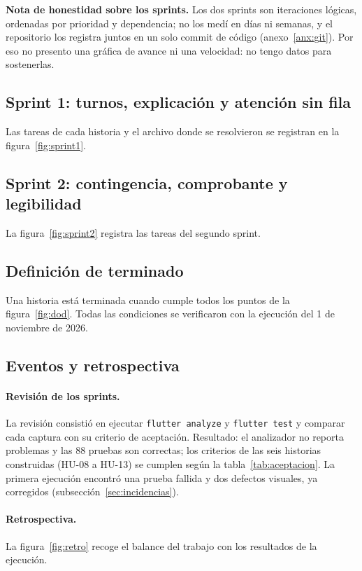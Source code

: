 \textbf{Nota de honestidad sobre los sprints.} Los dos sprints son iteraciones lógicas, ordenadas por prioridad y dependencia; no los medí en días ni semanas, y el repositorio los registra juntos en un solo commit de código (anexo~\ref{anx:git}). Por eso no presento una gráfica de avance ni una velocidad: no tengo datos para sostenerlas.

\subsection{Sprint 1: turnos, explicación y atención sin fila}
Las tareas de cada historia y el archivo donde se resolvieron se registran en la figura~\ref{fig:sprint1}.


\subsection{Sprint 2: contingencia, comprobante y legibilidad}
La figura~\ref{fig:sprint2} registra las tareas del segundo sprint.


\subsection{Definición de terminado}
Una historia está terminada cuando cumple todos los puntos de la figura~\ref{fig:dod}. Todas las condiciones se verificaron con la ejecución del 1 de noviembre de 2026.


\subsection{Eventos y retrospectiva}
\label{sec:retro}
\paragraph{Revisión de los sprints.} La revisión consistió en ejecutar \texttt{flutter analyze} y \texttt{flutter test} y comparar cada captura con su criterio de aceptación. Resultado: el analizador no reporta problemas y las 88 pruebas son correctas; los criterios de las seis historias construidas (HU-08 a HU-13) se cumplen según la tabla~\ref{tab:aceptacion}. La primera ejecución encontró una prueba fallida y dos defectos visuales, ya corregidos (subsección~\ref{sec:incidencias}).

\paragraph{Retrospectiva.} La figura~\ref{fig:retro} recoge el balance del trabajo con los resultados de la ejecución.

